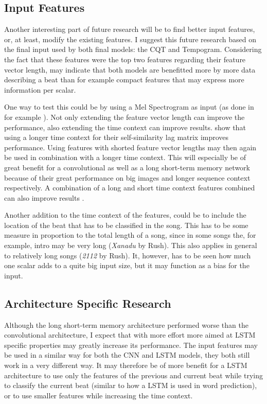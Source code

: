 \subsection{Input Features}
Another interesting part of future research will be to find better input features, or, at least, modify the existing features. I suggest this future research based on the final input used by both final models: the CQT and Tempogram. Considering the fact that these features were the top two features regarding their feature vector length, may indicate that both models are benefitted more by more data describing a beat than for example compact features that may express more information per scalar.

One way to test this could be by using a Mel Spectrogram as input (as done in for example \cite{Grill2015music,Schluter2013musical}). Not only extending the feature vector length can improve the performance, also extending the time context can improve results. \textcite{Grill2015music} show that using a longer time context for their self-similarity lag matrix improves performance. Using features with shorted feature vector lengths may then again be used in combination with a longer time context. This will especially be of great benefit for a convolutional as well as a long short-term memory network because of their great performance on big images and longer sequence context respectively. A combination of a long and short time context features combined can also improve results \cite{Grill2015music2}. 

Another addition to the time context of the features, could be to include the location of the beat that has to be classified in the song. This has to be some measure in proportion to the total length of a song, since in some songs the, for example, intro may be very long (\textit{Xanadu} by Rush). This also applies in general to relatively long songs (\textit{2112} by Rush). It, however, has to be seen how much one scalar adds to a quite big input size, but it may function as a bias for the input.

\subsection{Architecture Specific Research}
Although the long short-term memory architecture performed worse than the convolutional architecture, I expect that with more effort more aimed at LSTM specific properties may greatly increase its performance. The input features may be used in a similar way for both the CNN and LSTM models, they both still work in a very different way. It may therefore be of more benefit for a LSTM architecture to use only the features of the previous and current beat while trying to classify the current beat (similar to how a LSTM is used in word prediction), or to use smaller features while increasing the time context.

